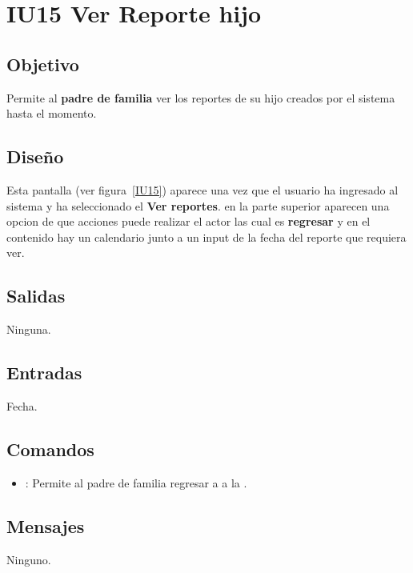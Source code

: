 \section{IU15 Ver Reporte hijo}

\subsection{Objetivo}
	Permite al {\bf padre de familia} ver los reportes de su hijo creados por el sistema hasta el momento.

\subsection{Diseño}
	Esta pantalla  (ver figura~\ref{IU15}) aparece una vez que el usuario ha ingresado al sistema y ha seleccionado el {\bf Ver reportes}. 
 en la parte superior aparecen una opcion de que acciones puede realizar el actor las cual es {\bf regresar} y en el contenido hay un calendario junto a un input de la fecha del reporte que requiera ver. 

 

\subsection{Salidas}

	Ninguna.

\subsection{Entradas}
Fecha.

\subsection{Comandos}
\begin{itemize}
	\item {}: Permite al padre de familia regresar a a la .
\end{itemize}

\subsection{Mensajes}

\begin{Citemize}
	\item Ninguno.
\end{Citemize}

